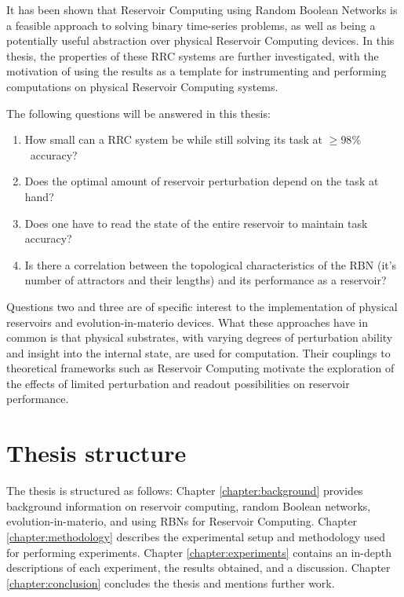 It has been shown that Reservoir Computing using Random Boolean Networks is a feasible approach to solving binary time-series problems,
as well as being a potentially useful abstraction over physical Reservoir Computing devices.
In this thesis, the properties of these RRC systems are further investigated,
with the motivation of using the results as a template for instrumenting and performing computations on physical Reservoir Computing systems.

The following questions will be answered in this thesis:
\begin{enumerate}
    \item How small can a RRC system be while still solving its task at $ \geq 98\% $ accuracy?
    \item Does the optimal amount of reservoir perturbation depend on the task at hand?
    \item Does one have to read the state of the entire reservoir to maintain task accuracy?
    \item Is there a correlation between the topological characteristics of the RBN (it's number of attractors and their lengths) and its performance as a reservoir?
\end{enumerate}

Questions two and three are of specific interest to the implementation of physical reservoirs and evolution-in-materio devices.
What these approaches have in common is that physical substrates,
with varying degrees of perturbation ability and insight into the internal state,
are used for computation.
Their couplings to theoretical frameworks such as Reservoir Computing motivate the exploration of the effects of limited perturbation and readout possibilities on reservoir performance.

\section{Thesis structure}

The thesis is structured as follows:
Chapter \ref{chapter:background} provides background information on reservoir computing, random Boolean networks, evolution-in-materio, and using RBNs for Reservoir Computing.
Chapter \ref{chapter:methodology} describes the experimental setup and methodology used for performing experiments.
Chapter \ref{chapter:experiments} contains an in-depth descriptions of each experiment, the results obtained, and a discussion.
Chapter \ref{chapter:conclusion} concludes the thesis and mentions further work.
